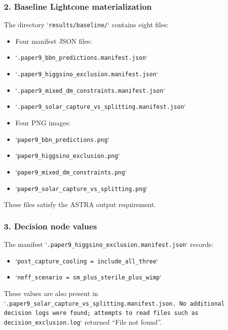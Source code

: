 \documentclass[11pt,a4paper]{article}
\begin{document}
\subsubsection{2. Baseline Lightcone materialization}
The directory `\texttt{results/\allowbreak{}baseline/\allowbreak{}}` contains eight files:

\begin{itemize}
  \item Four manifest JSON files:
  \item `\texttt{.paper9\_\allowbreak{}bbn\_\allowbreak{}predictions.manifest.json}`
  \item `\texttt{.paper9\_\allowbreak{}higgsino\_\allowbreak{}exclusion.manifest.json}`
  \item `\texttt{.paper9\_\allowbreak{}mixed\_\allowbreak{}dm\_\allowbreak{}constraints.manifest.json}`
  \item `\texttt{.paper9\_\allowbreak{}solar\_\allowbreak{}capture\_\allowbreak{}vs\_\allowbreak{}splitting.manifest.json}`
  \item Four PNG images:
  \item `\texttt{paper9\_\allowbreak{}bbn\_\allowbreak{}predictions.png}`
  \item `\texttt{paper9\_\allowbreak{}higgsino\_\allowbreak{}exclusion.png}`
  \item `\texttt{paper9\_\allowbreak{}mixed\_\allowbreak{}dm\_\allowbreak{}constraints.png}`
  \item `\texttt{paper9\_\allowbreak{}solar\_\allowbreak{}capture\_\allowbreak{}vs\_\allowbreak{}splitting.png}`
\end{itemize}
These files satisfy the ASTRA output requirement.

















\subsubsection{3. Decision node values}
The manifest `\texttt{.paper9\_\allowbreak{}higgsino\_\allowbreak{}exclusion.manifest.json}` records:

\begin{itemize}
  \item `\texttt{post\_\allowbreak{}capture\_\allowbreak{}cooling}\texttt{ =\allowbreak{} }\texttt{include\_\allowbreak{}all\_\allowbreak{}three}`
  \item `\texttt{neff\_\allowbreak{}scenario}\texttt{ =\allowbreak{} }\texttt{sm\_\allowbreak{}plus\_\allowbreak{}sterile\_\allowbreak{}plus\_\allowbreak{}wimp}`
\end{itemize}
These values are also present in `\texttt{.paper9\_\allowbreak{}solar\_\allowbreak{}capture\_\allowbreak{}vs\_\allowbreak{}splitting.manifest.json}\texttt{. No additional decision logs were found;\allowbreak{} attempts to read files such as }\texttt{decision\_\allowbreak{}exclusion.log}` returned ``File not found''.
\end{document}
